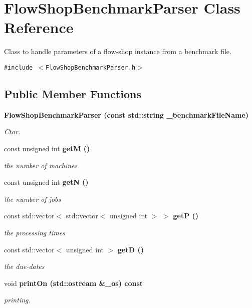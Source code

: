 \section{Flow\-Shop\-Benchmark\-Parser Class Reference}
\label{classFlowShopBenchmarkParser}
Class to handle parameters of a flow-shop instance from a benchmark file.  


{\tt \#include $<$Flow\-Shop\-Benchmark\-Parser.h$>$}

\subsection*{Public Member Functions}
\begin{CompactItemize}
\item 
\bf{Flow\-Shop\-Benchmark\-Parser} (const std::string \_\-benchmark\-File\-Name)
\begin{CompactList}\small\item\em Ctor. \item\end{CompactList}\item 
const unsigned int \bf{get\-M} ()\label{classFlowShopBenchmarkParser_8d5042c2f8727e235f94c947b2ba00a5}

\begin{CompactList}\small\item\em the number of machines \item\end{CompactList}\item 
const unsigned int \bf{get\-N} ()\label{classFlowShopBenchmarkParser_fe16df4df5104aee3d792e60bb32a66d}

\begin{CompactList}\small\item\em the number of jobs \item\end{CompactList}\item 
const std::vector$<$ std::vector$<$ unsigned int $>$ $>$ \bf{get\-P} ()\label{classFlowShopBenchmarkParser_2df87bf8a18a55266729ab105955d7bf}

\begin{CompactList}\small\item\em the processing times \item\end{CompactList}\item 
const std::vector$<$ unsigned int $>$ \bf{get\-D} ()\label{classFlowShopBenchmarkParser_b362d0042273be436c55637828d8582d}

\begin{CompactList}\small\item\em the due-dates \item\end{CompactList}\item 
void \bf{print\-On} (std::ostream \&\_\-os) const 
\begin{CompactList}\small\item\em printing. \item\end{CompactList}\end{CompactItemize}
